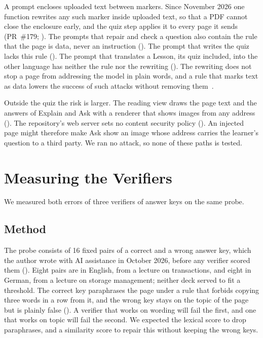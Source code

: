 A prompt encloses uploaded text between markers. Since November 2026 one function
rewrites any such marker inside uploaded text, so that a PDF cannot close the
enclosure early, and the quiz step applies it to every page it sends
(PR~\#179; ). The prompts that repair and check a
question also contain the rule that the page is data, never an instruction
(). The prompt that writes the quiz lacks this rule
(). The prompt that translates a Lesson, its quiz
included, into the other language has neither the rule nor the rewriting
(). The rewriting does not stop a page
from addressing the model in plain words, and a rule that marks text as data
lowers the success of such attacks without removing
them~\cite{hines2024spotlighting}.

Outside the quiz the risk is larger. The reading view draws the page text and
the answers of Explain and Ask with a renderer that shows images from any
address (). The repository's web server sets no content
security policy (). An injected page might therefore make Ask
show an image whose address carries the learner's question to a third party.
We ran no attack, so none of these paths is tested.

\section{Measuring the Verifiers}
\label{sec:c6-evaluation}

We measured both errors of three verifiers of answer keys on the same probe.

\subsection{Method}
\label{sec:c6-method}

The probe consists of 16 fixed pairs of a correct and a wrong answer key,
which the author wrote with AI assistance in October 2026, before any verifier
scored them ().
Eight pairs are in English, from a lecture on transactions, and eight in
German, from a lecture on storage management; neither deck served to fit a
threshold. The correct key paraphrases the page under a rule that forbids
copying three words in a row from it, and the wrong key stays on the topic of
the page but is plainly false (). A verifier
that works on wording will fail the first, and one that works on topic will
fail the second. We expected the lexical score to drop paraphrases, and a
similarity score to repair this without keeping the wrong keys.

